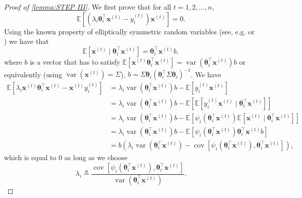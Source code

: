 \documentclass{article} %
\begin{document}
\noindent
\begin{proof}[Proof of \cref{lemma:STEP III}]
We first prove that for all $t=1,2,\dots,n$,
$$
\mathbb{E}\left[(\lambda_i \boldsymbol{\theta}_i^{\top} \mathbf{x}^{(t)}- y_i^{(t)})\mathbf{x}^{(t)} \right] = 0.
$$
Using the known property of elliptically symmetric random variables (see, e.g. \citet[page 319, comment following Condition 3.1]{li1991sliced} or \citet[Section 9.1]{balabdaoui2019least}) we have that 
$$
\mathbb{E}\left[\mathbf{x}^{(t)} \mid \boldsymbol{\theta}_i^\top \mathbf{x}^{(t)}\right]=\boldsymbol{\theta}_i^\top \mathbf{x}^{(t)} b,
$$
where $b$ is a vector that has to satisfy $\mathbb{E}\left[\mathbf{x}^{(t)} \boldsymbol{\theta}_i^\top \mathbf{x}^{(t)}\right]=\operatorname{var}(\boldsymbol{\theta}_i^\top \mathbf{x}^{(t)}) b$ or equivalently (using $\operatorname{var}(\mathbf{x}^{(t)})=\Sigma$), $b=\Sigma \boldsymbol{\theta}_i(\boldsymbol{\theta}_i^\top \Sigma \boldsymbol{\theta}_i)^{-1}$. We have
$$
\begin{aligned}
\mathbb{E}\left[\lambda_i \mathbf{x}^{(t)} \boldsymbol{\theta}_i^{\top} \mathbf{x}^{(t)}- \mathbf{x}^{(t)} y_i^{(t)} \right] &=\lambda_i\operatorname{var}(\boldsymbol{\theta}_i^\top \mathbf{x}^{(t)}) b-\mathbb{E}\left[y_i^{(t)}\mathbf{x}^{(t)}\right] \\
&=\lambda_i\operatorname{var}(\boldsymbol{\theta}_i^\top \mathbf{x}^{(t)}) b-\mathbb{E}\left[\mathbb{E}\left[y_i^{(t)}\mathbf{x}^{(t)} \mid \boldsymbol{\theta}_i^{\top}\mathbf{x}^{(t)}\right] \right] \\
&=\lambda_i\operatorname{var}(\boldsymbol{\theta}_i^\top \mathbf{x}^{(t)}) b-\mathbb{E}\left[\psi_i(\boldsymbol{\theta}_i^{\top}\mathbf{x}^{(t)})\mathbb{E}\left[\mathbf{x}^{(t)} \mid \boldsymbol{\theta}_i^{\top}\mathbf{x}^{(t)}\right] \right]\\
&=\lambda_i\operatorname{var}(\boldsymbol{\theta}_i^\top \mathbf{x}^{(t)}) b-\mathbb{E}\left[\psi_i(\boldsymbol{\theta}_i^{\top}\mathbf{x}^{(t)})\boldsymbol{\theta}_i^{\top}\mathbf{x}^{(t)}b \right] \\
&=b \left(\lambda_i\operatorname{var}(\boldsymbol{\theta}_i^\top \mathbf{x}^{(t)})- \operatorname{cov}\left[\psi_i(\boldsymbol{\theta}_i^{\top}\mathbf{x}^{(t)}),\boldsymbol{\theta}_i^{\top}\mathbf{x}^{(t)}\right]\right),
\end{aligned}
$$
which is equal to $0$ as long as we choose 
\begin{equation}\label{def:lambda_i}
\lambda_i \triangleq   \frac{\operatorname{cov}\left[\psi_i(\boldsymbol{\theta}_i^{\top}\mathbf{x}^{(t)}),\boldsymbol{\theta}_i^{\top}\mathbf{x}^{(t)}\right]}{\operatorname{var}(\boldsymbol{\theta}_i^\top \mathbf{x}^{(t)})}.

\end{equation}
\end{proof}
\end{document}
